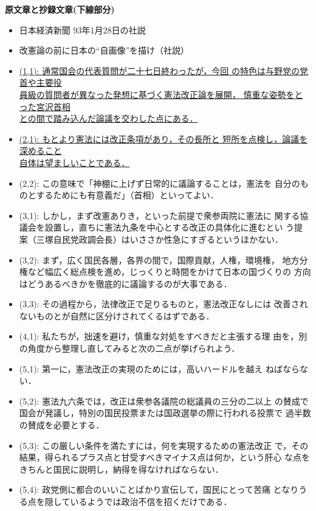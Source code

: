 {\baselineskip=15pt
{\bf 原文章と抄録文章(下線部分)}
{\normalsize
{\baselineskip=12pt
\begin{itemize}
\item [] 日本経済新聞 93年1月28日の社説
\item []改憲論の前に日本の“自画像”を描け（社説）
\item [] \underline{(1,1): 通常国会の代表質問が二十七日終わったが，今回
の特色は与野党の党首や主要役}\\
\underline{員級の質問者が異なった発想に基づく憲法改正論を展開，
慎重な姿勢をとった宮沢首相}\\ 
\underline{との間で踏み込んだ論議を交わした点にある．}
\item [] \underline{(2,1): もとより憲法には改正条項があり，その長所と
短所を点検し，論議を深めること}\\ \underline{自体は望ましいことである．}
\item [] (2,2): この意味で「神棚に上げず日常的に議論することは，憲法を
自分のものとするためにも有意義だ」（首相）といってよい．
\item [] (3,1): しかし，まず改憲ありき，といった前提で衆参両院に憲法に
関する協議会を設置し，直ちに憲法九条を中心とする改正の具体化に進むとい
う提案（三塚自民党政調会長）はいささか性急にすぎるというほかない．
\item [] (3,2): まず，広く国民各層，各界の間で，国際貢献，人権，環境権，
地方分権など幅広く総点検を進め，じっくりと時間をかけて日本の国づくりの
方向はどうあるべきかを徹底的に議論するのが大事である．
\item [] (3,3): その過程から，法律改正で足りるものと，憲法改正なしには
改善されないものとが自然に区分けされてくるはずである．
\item [] (4,1): 私たちが，拙速を避け，慎重な対処をすべきだと主張する理
由を，別の角度から整理し直してみると次の二点が挙げられよう．
 \item [] (5,1): 第一に，憲法改正の実現のためには，高いハードルを越え
ねばならない．
\item [] (5,2): 憲法九六条では，改正は衆参各議院の総議員の三分の二以上
の賛成で国会が発議し，特別の国民投票または国政選挙の際に行われる投票で
過半数の賛成を必要とする．
\item [] (5,3): この厳しい条件を満たすには，何を実現するための憲法改正
で，その結果，得られるプラス点と甘受すべきマイナス点は何か，という肝心
な点をきちんと国民に説明し，納得を得なければならない．
\item [] (5,4): 政党側に都合のいいことばかり宣伝して，国民にとって苦痛
となりうる点を隠しているようでは政治不信を招くだけである．

\end{itemize}}}}
